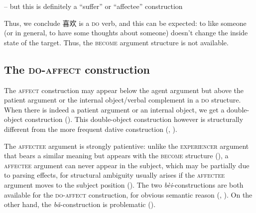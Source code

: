 \documentclass[UTF8, a4paper, oneside, scheme=plain, 12pt]{ctexrep}
\newcommand{\form}[1]{\emph{#1}}
\newcommand*{\category}[1]{\textsc{#1}}
\begin{document}
 -- but this is definitely a ``suffer'' or ``affectee'' construction

Thus, we conclude 喜欢 is a \category{do} verb, 
and this can be expected: 
to like someone (or in general, to have some thoughts about someone) 
doesn't change the inside state of the target.
Thus, the \category{become} argument structure is not available. 

\subsection{The \category{do}-\category{affect} construction}\label{sec:verb-phrase.do.affect}

The \category{affect} construction may appear 
below the agent argument 
but above the patient argument or the internal object/verbal complement 
in a \category{do} structure.
When there is indeed a patient argument 
or an internal object, 
we get a double-object construction 
().
This double-object construction however 
is structurally different from the more frequent 
dative construction 
(,
).

The \category{affectee} argument is strongly patientive:
unlike the \category{experiencer} argument that bears a similar meaning 
but appears with the \category{become} structure 
(),
a \category{affectee} argument can never appear in the subject,
which may be partially due to parsing effects,
for structural ambiguity usually arises 
if the \category{affectee} argument moves to the subject position
().
The two \form{bèi}-constructions are both available 
for the \category{do}-\category{affect} construction,
for obvious semantic reason
(, 
).
On the other hand, the \form{bǎ}-construction 
is problematic ().
\end{document}
